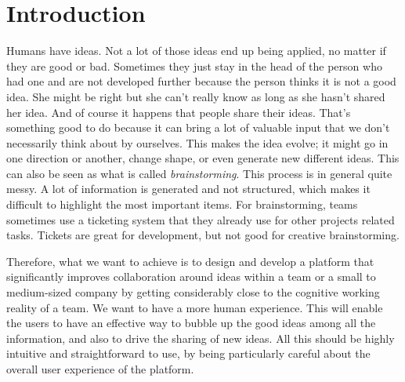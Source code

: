 \documentclass[a4paper,12pt, oneside]{article}
\newenvironment{acknowledgments}
  {\renewcommand{\abstractname}{Acknowledgments}
   \begin{abstract}}
  {\end{abstract}}
\begin{document}



\vspace*{5cm}
\begin{acknowledgments}
    \lipsum[1] %
\end{acknowledgments}
\newpage

\vspace*{5cm}
\begin{abstract}
    \lipsum[1] %
\end{abstract}
\newpage

\tableofcontents
\newpage

\setcounter{page}{1}


\section{Introduction}
Humans have ideas. Not a lot of those ideas end up being applied, no matter if they are good or bad.
Sometimes they just stay in the head of the person who had one and are not developed further because the person thinks it is not a good idea.
She might be right but she can't really know as long as she hasn't shared her idea. And of course it happens that people share their ideas.
That's something good to do because it can bring a lot of valuable input that we don't necessarily think about by ourselves.
This makes the idea evolve; it might go in one direction or another, change shape, or even generate new different ideas.
This can also be seen as what is called \emph{brainstorming}. This process is in general quite messy.
A lot of information is generated and not structured, which makes it difficult to highlight the most important items.
For brainstorming, teams sometimes use a ticketing system that they already use for other projects related tasks.
Tickets are great for development, but not good for creative brainstorming.

Therefore, what we want to achieve is to design and develop a platform that significantly improves collaboration around ideas within a team or a small to medium-sized company by getting considerably close to the cognitive working reality of a team.
We want to have a more human experience.
This will enable the users to have an effective way to bubble up the good ideas among all the information, and also to drive the sharing of new ideas.
All this should be highly intuitive and straightforward to use, by being particularly careful about the overall user experience of the platform.
\end{document}

